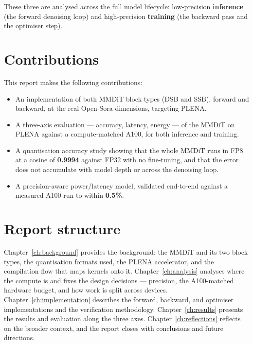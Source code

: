 \documentclass[11pt]{report}
\begin{document}
These three are analysed across the full model lifecycle: low-precision
\textbf{inference} (the forward denoising loop) and high-precision
\textbf{training} (the backward pass and the optimiser step).

\section{Contributions}
\label{sec:contributions}

This report makes the following contributions:

\begin{itemize}
\item An implementation of both MMDiT block types (DSB and SSB), forward
and backward, at the real Open-Sora dimensions, targeting PLENA.
\item A three-axis evaluation --- accuracy, latency, energy --- of the
MMDiT on PLENA against a compute-matched A100, for both inference and
training.
\item A quantisation accuracy study showing that the whole MMDiT runs in
FP8 at a cosine of \textbf{0.9994} against FP32 with no fine-tuning, and
that the error does not accumulate with model depth or across the
denoising loop.
\item A precision-aware power/latency model, validated end-to-end against
a measured A100 run to within \textbf{0.5\%}.
\end{itemize}

\section{Report structure}
\label{sec:structure}

Chapter~\ref{ch:background} provides the background: the MMDiT and its two
block types, the quantisation formats used, the PLENA accelerator, and the
compilation flow that maps kernels onto it. Chapter~\ref{ch:analysis}
analyses where the compute is and fixes the design decisions --- precision,
the A100-matched hardware budget, and how work is split across devices.
Chapter~\ref{ch:implementation} describes the forward, backward, and
optimiser implementations and the verification methodology.
Chapter~\ref{ch:results} presents the results and evaluation along the
three axes. Chapter~\ref{ch:reflections} reflects on the broader context,
and the report closes with conclusions and future directions.


\end{document}
